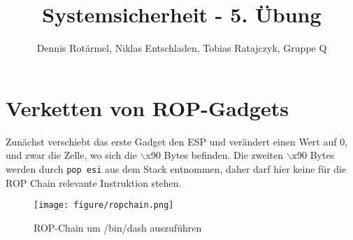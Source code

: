 \documentclass[]{scrreprt}
\title{Systemsicherheit - 5. Übung}
\author{Dennis Rotärmel, Niklas Entschladen, Tobias Ratajczyk, Gruppe Q}
\begin{document}
\maketitle
\chapter{Verketten von ROP-Gadgets}
Zunächst verschiebt das erste Gadget den ESP und verändert einen Wert auf 0, und zwar die Zelle, wo sich die $\backslash$x90 Bytes befinden. Die zweiten $\backslash$x90 Bytes werden durch \texttt{pop esi} aus dem Stack entnommen, daher darf hier keine für die ROP Chain relevante Instruktion stehen.
\begin{figure}[h]
	\centering
	\texttt{[image: figure/ropchain.png]}
	\caption{ROP-Chain um /bin/dash auszuführen}
\end{figure}
\end{document}

